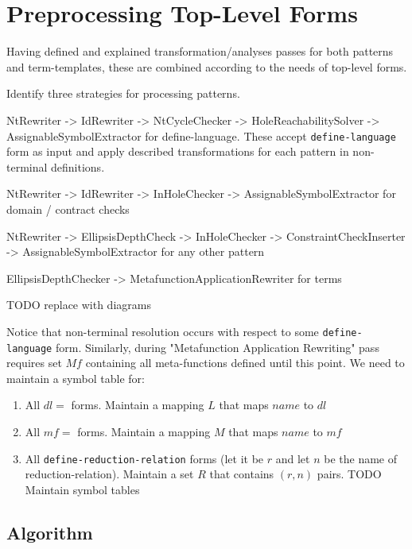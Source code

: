 \section{Preprocessing Top-Level Forms}

Having defined and explained transformation/analyses passes for both patterns and term-templates, these are combined according to the needs of top-level forms. 

Identify three strategies for processing patterns.

NtRewriter -> IdRewriter -> NtCycleChecker -> HoleReachabilitySolver -> AssignableSymbolExtractor for define-language. These accept \lstinline{define-language} form as input and apply described transformations for each pattern in non-terminal definitions.

NtRewriter -> IdRewriter -> InHoleChecker -> AssignableSymbolExtractor for domain / contract checks

NtRewriter -> EllipsisDepthCheck -> InHoleChecker -> ConstraintCheckInserter -> AssignableSymbolExtractor for any other pattern 

EllipsisDepthChecker -> MetafunctionApplicationRewriter for terms

TODO replace with diagrams

Notice that non-terminal resolution occurs with respect to some \lstinline{define-language} form. Similarly, during "Metafunction Application Rewriting" pass requires set $Mf$ containing all meta-functions defined until this point. We need to maintain a symbol table for:

\begin{enumerate}
\item All $dl =$ \DefineLanguage forms. Maintain a mapping $L$ that maps $name$ to $dl$
\item All $mf =$ \DefineMetafunction forms. Maintain a mapping $M$ that maps $name$ to $mf$
\item All \lstinline{define-reduction-relation} forms (let it be $r$ and let $n$ be the name of reduction-relation). Maintain a set $R$ that contains $(r, n)$ pairs.
TODO Maintain symbol tables
\end{enumerate}

\subsection{Algorithm}

